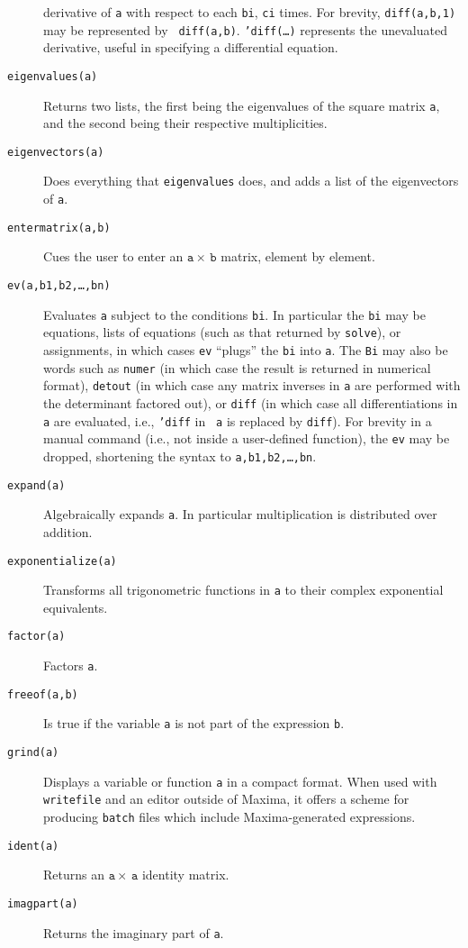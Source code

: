 \documentclass[a4paper,12pt]{article}
\begin{document}
\begin{description}
  derivative of {\tt a} with respect to each {\tt bi}, {\tt ci} times.
  For brevity, {\tt diff(a,b,1)} may be represented by {\tt
    diff(a,b)}.  {\tt 'diff(\ldots)} represents the unevaluated
  derivative, useful in specifying a differential equation.
\item[{\tt eigenvalues(a)}] Returns two lists, the first being the
  eigenvalues of the square matrix {\tt a}, and the second being their
  respective multiplicities.
\item[{\tt eigenvectors(a)}] Does everything that {\tt eigenvalues}
  does, and adds a list of the eigenvectors of {\tt a}.
\item[{\tt entermatrix(a,b)}] Cues the user to enter an $\mathtt{a}
  \times\, \mathtt{b}$ matrix, element by element.
\item[{\tt ev(a,b1,b2,\ldots,bn)}] Evaluates {\tt a} subject to the
  conditions {\tt bi}.  In particular the {\tt bi} may be equations,
  lists of equations (such as that returned by {\tt solve}), or
  assignments, in which cases {\tt ev} ``plugs'' the {\tt bi} into
  {\tt a}.  The {\tt Bi} may also be words such as {\tt numer} (in
  which case the result is returned in numerical format), {\tt detout}
  (in which case any matrix inverses in {\tt a} are performed with the
  determinant factored out), or {\tt diff} (in which case all
  differentiations in {\tt a} are evaluated, i.e., {\tt 'diff} in {\tt
    a} is replaced by {\tt diff}).  For brevity in a manual command
  (i.e., not inside a user-defined function), the {\tt ev} may be
  dropped, shortening the syntax to {\tt a,b1,b2,\ldots,bn}.
\item[{\tt expand(a)}] Algebraically expands {\tt a}.  In particular
  multiplication is distributed over addition.
\item[{\tt exponentialize(a)}] Transforms all trigonometric functions
  in {\tt a} to their complex exponential equivalents.
\item[{\tt factor(a)}] Factors {\tt a}.
\item[{\tt freeof(a,b)}] Is true if the variable {\tt a} is not part
  of the expression {\tt b}.
\item[{\tt grind(a)}] Displays a variable or function {\tt a} in a
  compact format.  When used with {\tt writefile} and an editor
  outside of Maxima, it offers a scheme for producing {\tt batch}
  files which include Maxima-generated expressions.
\item[{\tt ident(a)}] Returns an $\mathtt{a} \times\, \mathtt{a}$
  identity matrix.
\item[{\tt imagpart(a)}] Returns the imaginary part of {\tt a}.

\end{description}
\end{document}
